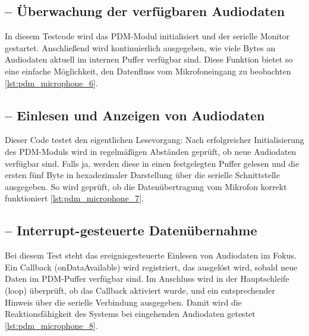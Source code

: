\subsection{ – Überwachung der verfügbaren Audiodaten}
In diesem Testcode wird das PDM-Modul initialisiert und der serielle Monitor gestartet. Anschließend wird kontinuierlich ausgegeben, wie viele Bytes an Audiodaten aktuell im internen Puffer verfügbar sind. Diese Funktion bietet so eine einfache Möglichkeit, den Datenfluss vom Mikrofoneingang zu beobachten \ref{lst:pdm_microphone_6}.

{
	\label{lst:pdm_microphone_6}
}

\subsection{ – Einlesen und Anzeigen von Audiodaten}
Dieser Code testet den eigentlichen Lesevorgang: Nach erfolgreicher Initialisierung des PDM-Moduls wird in regelmäßigen Abständen geprüft, ob neue Audiodaten verfügbar sind. Falls ja, werden diese in einen festgelegten Puffer gelesen und die ersten fünf Byte in hexadezimaler Darstellung über die serielle Schnittstelle ausgegeben. So wird geprüft, ob die Datenübertragung vom Mikrofon korrekt funktioniert \ref{lst:pdm_microphone_7}.

{
	\label{lst:pdm_microphone_7}
}

\subsection{ – Interrupt-gesteuerte Datenübernahme}
Bei diesem Test steht das ereignisgesteuerte Einlesen von Audiodaten im Fokus. Ein Callback (onDataAvailable) wird registriert, das ausgelöst wird, sobald neue Daten im PDM-Puffer verfügbar sind. Im Anschluss wird in der Hauptschleife (loop) überprüft, ob das Callback aktiviert wurde, und ein entsprechender Hinweis über die serielle Verbindung ausgegeben. Damit wird die Reaktionsfähigkeit des Systems bei eingehenden Audiodaten getestet \ref{lst:pdm_microphone_8}.

{
	\label{lst:pdm_microphone_8}
}

